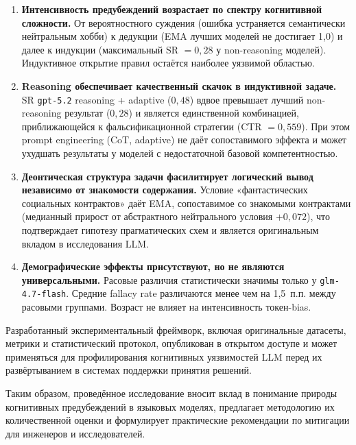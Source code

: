 \begin{enumerate}
  \item \textbf{Интенсивность предубеждений возрастает по спектру когнитивной сложности.} От вероятностного суждения (ошибка устраняется семантически нейтральным хобби) к дедукции (EMA лучших моделей не достигает 1{,}0) и далее к индукции (максимальный SR $= 0{,}28$ у non-reasoning моделей). Индуктивное открытие правил остаётся наиболее уязвимой областью.

  \item \textbf{Reasoning обеспечивает качественный скачок в индуктивной задаче.} SR \texttt{gpt-5.2} reasoning + adaptive ($0{,}48$) вдвое превышает лучший non-reasoning результат ($0{,}28$) и является единственной комбинацией, приближающейся к фальсификационной стратегии (CTR $= 0{,}559$). При этом prompt engineering (CoT, adaptive) не даёт сопоставимого эффекта и может ухудшать результаты у моделей с недостаточной базовой компетентностью.

  \item \textbf{Деонтическая структура задачи фасилитирует логический вывод независимо от знакомости содержания.} Условие «фантастических социальных контрактов» даёт EMA, сопоставимое со знакомыми контрактами (медианный прирост от абстрактного нейтрального условия $+0{,}072$), что подтверждает гипотезу прагматических схем и является оригинальным вкладом в исследования LLM.

  \item \textbf{Демографические эффекты присутствуют, но не являются универсальными.} Расовые различия статистически значимы только у \texttt{glm-4.7-flash}. Средние fallacy rate различаются менее чем на 1{,}5~п.п. между расовыми группами. Возраст не влияет на интенсивность токен-bias.
\end{enumerate}

Разработанный экспериментальный фреймворк, включая оригинальные датасеты, метрики и статистический протокол, опубликован в открытом доступе и может применяться для профилирования когнитивных уязвимостей LLM перед их развёртыванием в системах поддержки принятия решений.

Таким образом, проведённое исследование вносит вклад в понимание природы когнитивных предубеждений в языковых моделях, предлагает методологию их количественной оценки и формулирует практические рекомендации по митигации для инженеров и исследователей.

